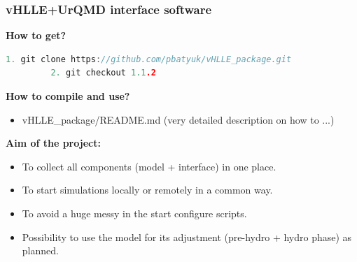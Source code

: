 \documentclass[dvipsnames] {beamer}
\begin{document}
        \begin{frame}[fragile]
  \bf
  \frametitle{\bf \centering vHLLE+UrQMD interface software}
  \begin{block}{\bf \centering \color{darkred!70!black} How to get?}
    \scriptsize
       \begin{lstlisting}[language=C++,basicstyle=\ttfamily,keywordstyle=\color{darkred!70!black}]
         1. git clone https://github.com/pbatyuk/vHLLE_package.git
         2. git checkout 1.1.2
       \end{lstlisting}
  \end{block}
  \begin{block}{\bf \centering \color{darkred!70!black} How to compile and use?}
    \begin{itemize}
      \item vHLLE\_package/README.md (very detailed description on how to ...) 
    \end{itemize}
  \end{block}
   \begin{block}{\bf \centering \color{darkred!70!black} Aim of the project:}
     \begin{itemize}
     \item To collect all components (model + interface) in one place.
    \item To start simulations locally or remotely in a common way.
    \item To avoid a huge messy in the start configure scripts.
      \item {\color {darkblue!70!black} Possibility to use the model for its adjustment (pre-hydro + hydro phase)} as planned.
    \end{itemize}
  \end{block}
\end{frame}
\end{document}
